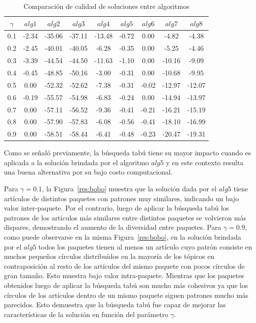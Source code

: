\begin{table}
\begin{center}
\begin{tabular}{|c|c|c|c|c|c|c|c|c|}
\hline
$\gamma$&$alg1$&$alg2$&$alg3$&$alg4$&$alg5$&$alg6$&$alg7$&$alg8$ \\ \hline
0.1 & -2.34	& -35.06 & -37.11 & -13.48 & -0.72 &  0.00 &  -4.82 &  -4.38 \\
0.2 & -2.45	& -40.01 & -40.05 & -6.28 & -0.35 &  0.00 &  -5.25 &  -4.46 \\
0.3 & -3.39	& -44.54 & -44.50 & -11.63 & -1.10 &  0.00 & -10.16 &  -9.09 \\
0.4 & -0.45	& -48.85 & -50.16 & -3.00 & -0.31 &  0.00 & -10.68 &  -9.95 \\
0.5 & 0.00  & -52.32 & -52.62 & -7.38 & -0.31 & -0.02 & -12.97 & -12.07 \\
0.6 & -0.19 & -55.57 & -54.98 & -6.83 & -0.24 &  0.00 & -14.94 & -13.97 \\
0.7 & 0.00  & -57.11 & -56.52 & -9.36 & -0.41 & -0.21 & -16.21 & -15.19 \\
0.8 & 0.00  & -57.90 & -57.83 & -6.08 & -0.56 & -0.41 & -18.10 & -16.99 \\
0.9 & 0.00  & -58.51 & -58.44 & -6.41 & -0.48 & -0.23 & -20.47 & -19.31 \\ \hline 
\end{tabular}
\caption{Comparación de calidad de soluciones entre algoritmos} 
\label{tabla:comp1}
\end{center}
\end{table}

Como se señaló previamente, la búsqueda tabú tiene su mayor impacto cuando es aplicada a la solución brindada por el algoritmo $alg5$ y en este contexto resulta una buena alternativa por su bajo costo computacional. 

Para $\gamma=0.1$, la Figura~\ref{res:bobo} muestra que la solución dada por el $alg5$ tiene artículos de distintos paquetes con patrones muy similares, indicando un bajo valor inter-paquete. Por el contrario, luego de aplicar la búsqueda tabú los patrones de los artículos más similares entre distintos paquetes se volvieron más dispares, demostrando el aumento de la diversidad entre paquetes. Para $\gamma=0.9$, como puede observarse en la misma Figura~\ref{res:bobo}, en la solución brindada por el $alg5$ todos los paquetes tienen al menos un artículo cuyo patrón consiste en muchos pequeños círculos distribuídos en la mayoría de los tópicos en contraposición al resto de los artículos del mismo paquete con pocos círculos de gran tamaño. Esto muestra bajo valor intra-paquete. Mientras que los paquetes obtenidos luego de aplicar la búsqueda tabú son mucho más cohesivos ya que los círculos de los artículos dentro de un mismo paquete siguen patrones mucho más parecidos. Esto demuestra que la búsqueda tabú fue capaz de mejorar las características de la solución en función del parámetro $\gamma$.

